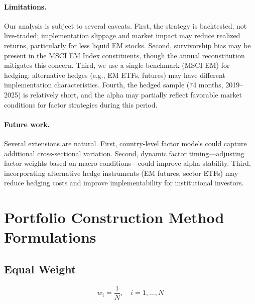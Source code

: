 \documentclass[12pt,a4paper]{article}
\begin{document}
\paragraph{Limitations.} Our analysis is subject to several caveats. First, the strategy is backtested, not live-traded; implementation slippage and market impact may reduce realized returns, particularly for less liquid EM stocks. Second, survivorship bias may be present in the MSCI EM Index constituents, though the annual reconstitution mitigates this concern. Third, we use a single benchmark (MSCI EM) for hedging; alternative hedges (e.g., EM ETFs, futures) may have different implementation characteristics. Fourth, the hedged sample (74 months, 2019--2025) is relatively short, and the alpha may partially reflect favorable market conditions for factor strategies during this period.

\paragraph{Future work.} Several extensions are natural. First, country-level factor models could capture additional cross-sectional variation. Second, dynamic factor timing---adjusting factor weights based on macro conditions---could improve alpha stability. Third, incorporating alternative hedge instruments (EM futures, sector ETFs) may reduce hedging costs and improve implementability for institutional investors.


\newpage




\newpage
\appendix
\section{Portfolio Construction Method Formulations}
\label{app:methods}

\subsection{Equal Weight}
\begin{equation}
    w_i = \frac{1}{N}, \quad i = 1, \ldots, N
\end{equation}
\end{document}
